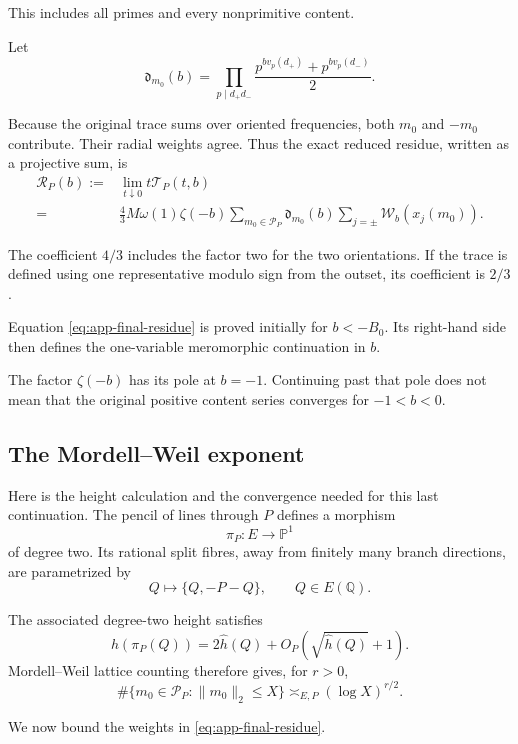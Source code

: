 \documentclass[11pt]{article}
\begin{document}
This includes all primes and every
nonprimitive content.

Let
\[
\mathfrak d_{m_0}(b)=
\prod_{p\mid d_+d_-}
\frac{
p^{b v_p(d_+)}
+p^{b v_p(d_-)}
}{2}.
\]

Because the original trace sums over
oriented frequencies, both $m_0$
and $-m_0$ contribute. Their radial
weights agree. Thus the exact reduced
residue, written as a projective sum, is
\begin{equation}\label{eq:app-final-residue}
\boxed{
\begin{aligned}
\mathcal R_P(b)
:={}&\lim_{t\downarrow0}t\mathcal T_P(t,b)\\
={}&\frac43M\omega(1)\zeta(-b)
\sum_{m_0\in\mathcal P_P}
\mathfrak d_{m_0}(b)
\sum_{j=\pm}\mathcal W_b(x_j(m_0)).
\end{aligned}}
\end{equation}

The coefficient $4/3$ includes the
factor two for the two orientations.
If the trace is defined using one
representative modulo sign from the
outset, its coefficient is $2/3$.

Equation \eqref{eq:app-final-residue}
is proved initially for $b<-B_0$.
Its right-hand side then defines the
one-variable meromorphic continuation
in $b$.

The factor $\zeta(-b)$ has its pole
at $b=-1$. Continuing past that pole
does not mean that the original
positive content series converges
for $-1<b<0$.

\subsection{The Mordell--Weil exponent}

Here is the height calculation and the convergence needed for this
last continuation. The pencil of lines through $P$ defines
a morphism
\[
\pi_P:E\longrightarrow\mathbb P^1
\]
of degree two. Its rational split
fibres, away from finitely many branch
directions, are parametrized by
\[
Q\longmapsto\{Q,-P-Q\},
\qquad Q\in E(\mathbb Q).
\]

The associated degree-two height satisfies
\[
h(\pi_P(Q))
=
2\widehat h(Q)
+O_P(\sqrt{\widehat h(Q)}+1).
\]
Mordell--Weil lattice counting therefore
gives, for $r>0$,
\begin{equation}\label{eq:app-pencil-count}
\#\{m_0\in\mathcal P_P:
\|m_0\|_2\le X\}
\asymp_{E,P}(\log X)^{r/2}.
\end{equation}

We now bound the weights in
\eqref{eq:app-final-residue}.
\end{document}
